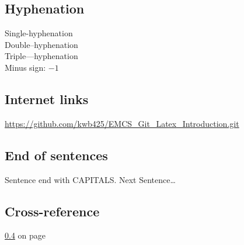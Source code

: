 \documentclass[12pt, oneside]{article}
\begin{document}
\subsection{Hyphenation}
Single-hyphenation \\ %
Double--hyphenation \\ %
Triple---hyphenation \\ %
Minus sign: $-1$ \\ %



\subsection{Internet links}
\url{https://github.com/kwb425/EMCS_Git_Latex_Introduction.git}



\subsection{End of sentences}
Sentence end with CAPITALS\@. 
Next Sentence\ldots 



\subsection{Cross-reference}
\label{sample_label_1}
\ref{sample_label_1} on page
~\pageref{sample_label_1} 



\end{document}
